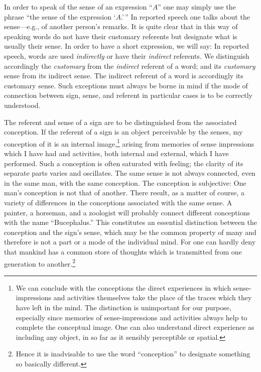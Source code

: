\documentclass[twoside,12pt,a4paper]{article}
\begin{document}
In order to speak of the sense of an expression ``$A$'' one may simply
use the phrase ``the sense of the expression `$A$.'\,'' In reported
speech one talks about the sense---e.g., of another person's remarks. It
is quite clear that in this way of speaking words do not have their
customary referents but designate what is usually their sense. In
order to have a short expression, we will say: In reported speech,
words are used \emph{indirectly} or have their \emph{indirect}
referents. We distinguish accordingly the \emph{customary} from the
\emph{indirect} referent of a word; and its \emph{customary} sense
from its indirect sense. The indirect referent of a word is
accordingly its customary sense. Such exceptions must always be borne
in mind if the mode of connection between sign, sense, and referent in
particular cases is to be correctly understood.

The referent and sense of a sign are to be distinguished from the
associated conception. If the referent of a sign is an object
perceivable by the senses, my conception of it is an internal
image,\footnote[3]{We can conclude with the conceptions the direct
  experiences in which sense-impressions and activities themselves
  take the place of the traces which they have left in the mind. The
  distinction is unimportant for our purpose, especially since
  memories of sense-impressions and activities always help to complete
  the conceptual image. One can also understand direct experience as
  including any object, in so far as it sensibly perceptible or
  spatial.} arising from memories of sense impressions which I have
had and activities, both internal and external, which I have
performed. Such a conception is often saturated with feeling; the
clarity of its separate parts varies and oscillates. The same sense is
not always connected, even in the same man, with the same conception.
The conception is subjective: One man's conception is not that of
another. There result, as a matter of course, a variety of differences
in the conceptions associated with the same sense. A painter, a
horseman, and a zoologist will probably connect different conceptions
with the name ``Bucephalus.'' This constitutes an essential
distinction between the conception and the sign's sense, which may be
the common property of many and therefore is not a part or a mode of
the individual mind. For one can hardly deny that mankind has a common
store of thoughts which is transmitted from one generation to
another.\footnote[4]{Hence it is inadvisable to use the word
  ``conception'' to designate something so basically different.}
\end{document}
